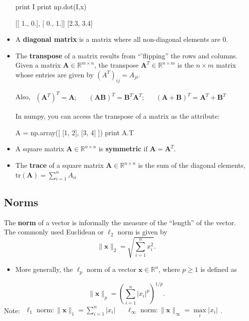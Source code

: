 \begin{itemize}
\begin{python}
print I
print np.dot(I,x)

[[ 1.,  0.],
 [ 0.,  1.]]
[2.3, 3.4]
\end{python}

\item A {\bf diagonal matrix} is a matrix where all non-diagonal elements are $0$.


\item The {\bf transpose} of a matrix results from ``'flipping'' the rows and columns. 
Given a matrix $\textbf{A} \in \mathbb{R}^{m\times n}$, the transpose $\textbf{A}^{T} \in \mathbb{R}^{n\times m}$
is the $n \times m$ matrix whose entries are given by $(A^{T})_{ij}= A_{ji}$.

Also, $\begin{array}{ccccc}(\textbf{A}^{T})^{T}= \textbf{A}; &  & (\textbf{AB})^{T}=\textbf{B}^{T}\textbf{A}^{T}; & & (\textbf{A}+\textbf{B})^{T}= \textbf{A}^{T}+\textbf{B}^{T} \end{array}$

In numpy, you can access the transpose of a matrix as the  attribute:

\begin{python}
A = np.array([ [1, 2], [3, 4] ])
print A.T
\end{python}

\item A square matrix $\textbf{A} \in \mathbb{R}^{n\times n}$ is {\bf symmetric} if  $\textbf{A}=\textbf{A}^{T}$.

\item The {\bf trace} of a square matrix $\textbf{A} \in \mathbb{R}^{n\times n}$ is the sum of the diagonal
elements, tr$(\textbf{A})= \sum\limits_{i=1}^{n} A_{ii}$

\end{itemize}
\subsection{Norms}
The {\bf norm} of a vector is informally the measure of the ``length'' of the vector. The commonly used Euclidean or $\ell_{2}$ norm is given by
\begin{equation*}
\|\textbf{x}\|_{2}=\sqrt{\sum\limits_{i=1}^{n} x_{i}^{2}}.
\end{equation*}

\begin{itemize}
\item More generally, the $\ell_{p}$ norm of a vector $\textbf{x} \in \mathbb{R}^{n}$, where $p \geq 1$ is defined as 
\end{itemize}
\begin{equation*}
\|\textbf{x}\|_{p}=\left(\sum\limits_{i=1}^{n}|x_{i}|^{p}\right)^{1/p}.
\end{equation*}
Note: $\begin{array}{ccc} \ell_{1} \text{ norm}: \|\textbf{x}\|_{1} = \sum\limits_{i=1}^{n} |x_{i}| && \ell_{\infty} \text{ norm}: \|\textbf{x}\|_{\infty} = \max\limits_{i} |x_{i}| \end{array}$.

